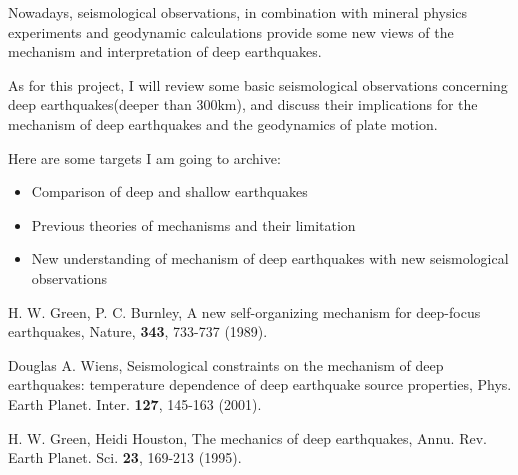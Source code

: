 \documentclass[12pt]{article}
\begin{document}
Nowadays, seismological observations, in combination with mineral
physics experiments and geodynamic calculations provide some new views of
the mechanism and interpretation of deep earthquakes.

As for this project, I will review some basic seismological observations
concerning deep earthquakes(deeper than 300km), and discuss their
implications for the mechanism of deep earthquakes and the geodynamics of plate motion.

Here are some targets I am going to archive:
\begin{itemize}
\item Comparison of deep and shallow earthquakes
\item Previous theories of mechanisms and their limitation
\item New understanding of mechanism of deep earthquakes with new seismological observations
\end{itemize}


\begin{thebibliography}{99}

 H. W. Green, P. C. Burnley,
{A new self-organizing mechanism for deep-focus earthquakes},
Nature, {\bf 343}, 733-737 (1989).

 Douglas A. Wiens,
{Seismological constraints on the mechanism of deep earthquakes:
temperature dependence of deep earthquake source properties},
Phys. Earth Planet. Inter. {\bf 127}, 145-163 (2001).

 H. W. Green, Heidi Houston,
{The mechanics of deep earthquakes},
Annu. Rev. Earth Planet. Sci. {\bf 23}, 169-213 (1995).

\end{thebibliography}
\end{document}
